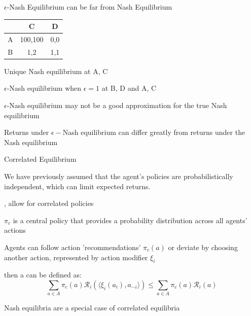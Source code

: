 \begin{frame}{$\epsilon$-Nash Equilibrium can be far from Nash Equilibrium}

    \centering
    \begin{tabular}[b]{c|c|c}
    & C & D \\
    \hline
    A & 100,100 & 0,0 \\
    \hline
    B & 1,2 & 1,1 \\
    \end{tabular}
    \vspace{10pt}
    
    \blist
        \item Unique Nash equilibrium at A, C
        \item \(\epsilon\)-Nash equilibrium when \(\epsilon = 1\) at B, D and A, C
        \item \(\epsilon\)-Nash equilibrium may not be a good approximation for the true Nash equilibrium
        \item Returns under $\epsilon-$Nash equilibrium can differ greatly from returns under the Nash equilibrium
    \elist
\end{frame}

\begin{frame}{Correlated Equilibrium}

    We have previously assumed that the agent's policies are probabilistically independent, which can limit expected returns.

    \blist
        \item {}, allow for correlated policies
        \item \(\pi_c\) is a central policy that provides a probability distribution across all agents' actions
        \item Agents can follow action 'recommendations' $\pi_c(a)$ or deviate by choosing another action, represented by action modifier $\xi_i$
        \item then a  can be defined as:
    \elist
    \vspace{0pt}
    \begin{equation*}
        \sum_{a \in A}\pi_c(a)\mathcal{R}_i(\langle\xi_i(a_i), a_{-i}\rangle) \le \sum_{a \in A}\pi_c(a)\mathcal{R}_i(a)
    \end{equation*}

    \blist
     \item Nash equilibria are a special case of correlated equilibria 
    \elist
    
\end{frame}

